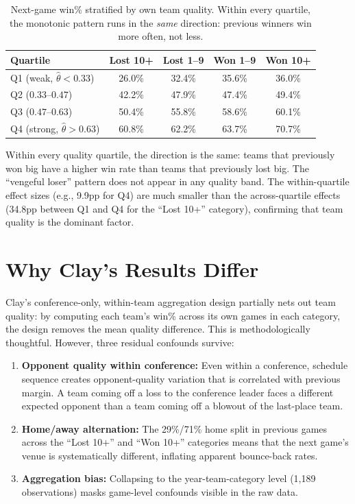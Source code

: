 \documentclass[11pt]{article}
\begin{document}
\begin{table}[h]
\centering
\begin{tabular}{lcccc}
\toprule
Quartile & Lost 10+ & Lost 1--9 & Won 1--9 & Won 10+ \\
\midrule
Q1 (weak, $\hat{\theta} < 0.33$) & 26.0\% & 32.4\% & 35.6\% & 36.0\% \\
Q2 ($0.33$--$0.47$) & 42.2\% & 47.9\% & 47.4\% & 49.4\% \\
Q3 ($0.47$--$0.63$) & 50.4\% & 55.8\% & 58.6\% & 60.1\% \\
Q4 (strong, $\hat{\theta} > 0.63$) & 60.8\% & 62.2\% & 63.7\% & 70.7\% \\
\bottomrule
\end{tabular}
\caption{Next-game win\% stratified by own team quality. Within every quartile, the monotonic pattern runs in the \emph{same} direction: previous winners win more often, not less.}
\label{tab:stratified}
\end{table}

\noindent Within every quality quartile, the direction is the same: teams that previously won big have a higher win rate than teams that previously lost big. The ``vengeful loser'' pattern does not appear in any quality band. The within-quartile effect sizes (e.g., 9.9pp for Q4) are much smaller than the across-quartile effects (34.8pp between Q1 and Q4 for the ``Lost 10+'' category), confirming that team quality is the dominant factor.

\section{Why Clay's Results Differ}

Clay's conference-only, within-team aggregation design partially nets out team quality: by computing each team's win\% across its own games in each category, the design removes the mean quality difference. This is methodologically thoughtful. However, three residual confounds survive:

\begin{enumerate}
    \item \textbf{Opponent quality within conference:} Even within a conference, schedule sequence creates opponent-quality variation that is correlated with previous margin. A team coming off a loss to the conference leader faces a different expected opponent than a team coming off a blowout of the last-place team.
    \item \textbf{Home/away alternation:} The 29\%/71\% home split in previous games across the ``Lost 10+'' and ``Won 10+'' categories means that the next game's venue is systematically different, inflating apparent bounce-back rates.
    \item \textbf{Aggregation bias:} Collapsing to the year-team-category level (1,189 observations) masks game-level confounds visible in the raw data.
\end{enumerate}
\end{document}
